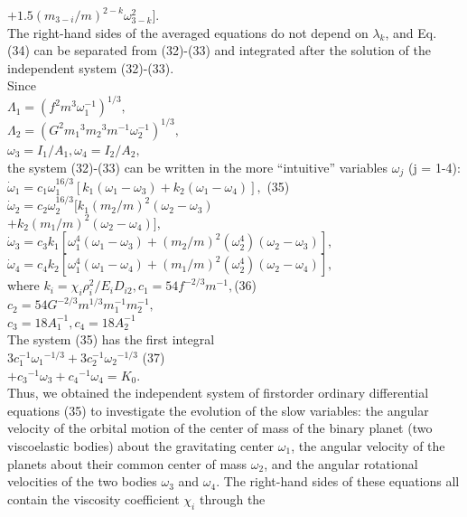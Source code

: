 \documentclass[fontsize = 11pt,a4paper]{article}
\begin{document}
\begin{multicols}{2}
$+1.5 {(m_{3-i} / m)}^{2-k}\omega^2_{3-k}].$\\
The right-hand sides of the averaged equations do
not depend on $\lambda_k$, and Eq. (34) can be separated
from (32)-(33) and integrated after the solution of the
independent system (32)-(33).\\
Since\\
$\Lambda_1 = {(f^2m^3\omega^{-1}_1)}^{1/3},$\\
$\Lambda_2 = {(G^2{m_1}^3 {m_2}^3 m^{-1} \omega^{-1}_2)}^{1/3},$\\
$\omega_3 = I_1 / A_1, \omega_4 = I_2/A_2,$\\
the system (32)-(33) can be written in the more
“intuitive” variables $\omega_j$ (j = 1-4):\\
$\dot \omega_1 = c_1 \omega^{16/3}_1 [k_1(\omega_1 - \omega_3) + k_2 ( \omega_1 - \omega_4)],$ \hfill (35)\\
$\dot \omega_2 = c_2 \omega^{16/3}_2 [k_1{(m_2 / m)}^2 (\omega_2 - \omega_3)$\\
$ + k_2 {(m_1 / m)}^2 ( \omega_2 - \omega_4)],$\\
$\dot \omega_3 = c_3 k_1 [ \omega^{4}_1 (\omega_1 - \omega_3) +  {(m_2 / m)}^2 (\omega_2^4) (\omega_2 - \omega_3)],$\\
$\dot \omega_4 = c_4 k_2 [ \omega^{4}_1 (\omega_1 - \omega_4) +  {(m_1 / m)}^2 (\omega_2^4) (\omega_2 - \omega_4)],$\\
where
$k_i = \chi_i \rho_i^2 / E_i D_{i2}, c_1=54f^{-2/3}m^{-1},$\hfill (36)\\
$c_2 = 54G^{-2/3} m^{1/3} m^{-1}_1 m^{-1}_2,$ \\
$c_3 = 18A^{-1}_1, c_4 = 18A^{-1}_2$\\
The system (35) has the first integral\\
$3c^{-1}_1 {\omega_1}^{-1/3} + 3c^{-1}_2 {\omega_2}^{-1/3}$ \hfill (37) \\
$+ {c_3}^{-1} \omega_3 +  {c_4}^{-1} \omega_4 = K_0.$\\
Thus, we obtained the independent system of firstorder
ordinary differential equations (35) to investigate
the evolution of the slow variables: the angular
velocity of the orbital motion of the center of mass
of the binary planet (two viscoelastic bodies) about
the gravitating center $\omega_1$, the angular velocity of the
planets about their common center of mass  $\omega_2$, and
the angular rotational velocities of the two bodies
$\omega_3$ and $\omega_4$. The right-hand sides of these equations
all contain the viscosity coefficient $\chi_i$ through the

\end{multicols}
\end{document}
